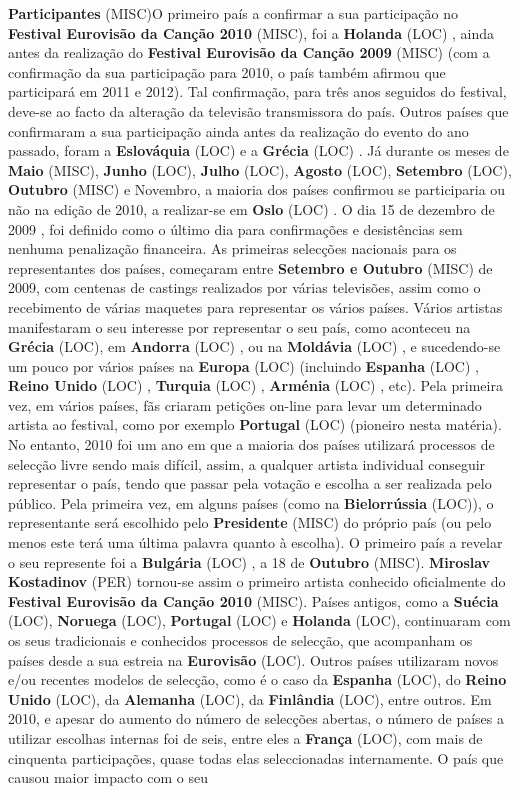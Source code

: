 \documentclass[12pt,a4paper]{article}
\begin{document}
\textbf{Participantes} (MISC)O primeiro país a confirmar a sua participação no \textbf{Festival Eurovisão da Canção 2010} (MISC), foi a \textbf{Holanda} (LOC) , ainda antes da realização do \textbf{Festival Eurovisão da Canção 2009} (MISC) (com a confirmação da sua participação para 2010, o país também afirmou que participará em 2011 e 2012). Tal confirmação, para três anos seguidos do festival, deve-se ao facto da alteração da televisão transmissora do país. Outros países que confirmaram a sua participação ainda antes da realização do evento do ano passado, foram a \textbf{Eslováquia} (LOC) e a \textbf{Grécia} (LOC) . Já durante os meses de \textbf{Maio} (MISC), \textbf{Junho} (LOC), \textbf{Julho} (LOC), \textbf{Agosto} (LOC), \textbf{Setembro} (LOC), \textbf{Outubro} (MISC) e Novembro, a maioria dos países confirmou se participaria ou não na edição de 2010, a realizar-se em \textbf{Oslo} (LOC) . O dia 15 de dezembro de 2009 , foi definido como o último dia para confirmações e desistências sem nenhuma penalização financeira. As primeiras selecções nacionais para os representantes dos países, começaram entre \textbf{Setembro e Outubro} (MISC) de 2009, com centenas de castings realizados por várias televisões, assim como o recebimento de várias maquetes para representar os vários países. Vários artistas manifestaram o seu interesse por representar o seu país, como aconteceu na \textbf{Grécia} (LOC), em \textbf{Andorra} (LOC) , ou na \textbf{Moldávia} (LOC) , e sucedendo-se um pouco por vários países na \textbf{Europa} (LOC) (incluindo \textbf{Espanha} (LOC) , \textbf{Reino Unido} (LOC) , \textbf{Turquia} (LOC) , \textbf{Arménia} (LOC) , etc). Pela primeira vez, em vários países, fãs criaram petições on-line para levar um determinado artista ao festival, como por exemplo \textbf{Portugal} (LOC) (pioneiro nesta matéria). No entanto, 2010 foi um ano em que a maioria dos países utilizará processos de selecção livre sendo mais difícil, assim, a qualquer artista individual conseguir representar o país, tendo que passar pela votação e escolha a ser realizada pelo público. Pela primeira vez, em alguns países (como na \textbf{Bielorrússia} (LOC)), o representante será escolhido pelo \textbf{Presidente} (MISC) do próprio país (ou pelo menos este terá uma última palavra quanto à escolha). O primeiro país a revelar o seu represente foi a \textbf{Bulgária} (LOC) , a 18 de \textbf{Outubro} (MISC). \textbf{Miroslav Kostadinov} (PER) tornou-se assim o primeiro artista conhecido oficialmente do \textbf{Festival Eurovisão da Canção 2010} (MISC). Países antigos, como a \textbf{Suécia} (LOC), \textbf{Noruega} (LOC), \textbf{Portugal} (LOC) e \textbf{Holanda} (LOC), continuaram com os seus tradicionais e conhecidos processos de selecção, que acompanham os países desde a sua estreia na \textbf{Eurovisão} (LOC). Outros países utilizaram novos e/ou recentes modelos de selecção, como é o caso da \textbf{Espanha} (LOC), do \textbf{Reino Unido} (LOC), da \textbf{Alemanha} (LOC), da \textbf{Finlândia} (LOC), entre outros. Em 2010, e apesar do aumento do número de selecções abertas, o número de países a utilizar escolhas internas foi de seis, entre eles a \textbf{França} (LOC), com mais de cinquenta participações, quase todas elas seleccionadas internamente. O país que causou maior impacto com o seu 
\end{document}
